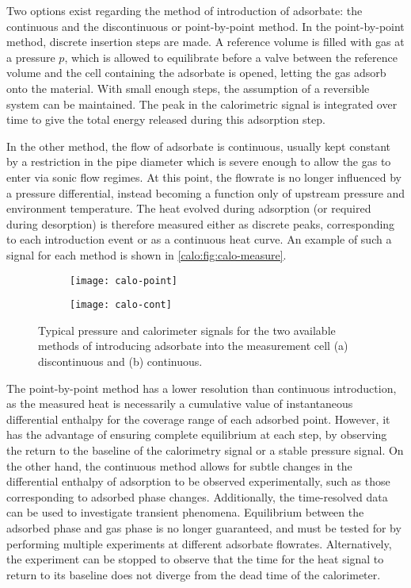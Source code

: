 Two options exist regarding the method of introduction of adsorbate:
the continuous and the discontinuous or point-by-point method. In
the point-by-point method, discrete insertion steps are made.
A reference volume is filled with gas at a pressure \(p\), which
is allowed to equilibrate before a valve between the reference volume
and the cell containing the adsorbate is opened, letting the
gas adsorb onto the material. With small enough steps, the
assumption of a reversible system can be maintained.
The peak in the calorimetric signal is integrated over time
to give the total energy released during this adsorption step.

In the other method, the flow of adsorbate is continuous, usually kept
constant by a restriction in the pipe diameter which is severe enough
to allow the gas to enter via sonic flow regimes. At this point, the
flowrate is no longer influenced by a pressure differential,
instead becoming a function only of upstream pressure and environment
temperature.
The heat evolved during adsorption (or required during desorption)
is therefore measured either as discrete peaks, corresponding to
each introduction event or as a continuous heat curve. An example of 
such a signal for each method is shown in \autoref{calo:fig:calo-measure}.

\begin{figure}[htb]

	\centering
	\begin{subfigure}[b]{.5\textwidth}
		\centering
		\texttt{[image: calo-point]}
		\caption{}%
		\label{calo:fig:calo-point}
	\end{subfigure}
	\begin{subfigure}[b]{.48\textwidth}
		\centering
		\texttt{[image: calo-cont]}
		\caption{}%
		\label{calo:fig:calo-cont}
	\end{subfigure}%
	\caption{Typical pressure and calorimeter signals for the two
		available methods of introducing adsorbate into the measurement
		cell (a) discontinuous and (b) continuous.
	}%
	\label{calo:fig:calo-measure}

\end{figure}

The point-by-point method has a lower resolution than
continuous introduction, as the measured heat is necessarily a 
cumulative value of instantaneous
differential enthalpy for the coverage range of each adsorbed point.
However, it has the advantage of ensuring complete equilibrium at
each step, by observing the return to the baseline of the calorimetry
signal or a stable pressure signal. On the other hand, the
continuous method allows for subtle changes in the differential enthalpy of
adsorption to be observed experimentally, such as those corresponding to
adsorbed phase changes. Additionally, the time-resolved data
can be used to investigate transient phenomena. Equilibrium between
the adsorbed phase and gas phase is no longer guaranteed, and must be
tested for by performing multiple experiments at different adsorbate
flowrates. Alternatively, the experiment can be stopped to observe that the
time for the heat signal to return to its baseline does not diverge
from the dead time of the calorimeter.

